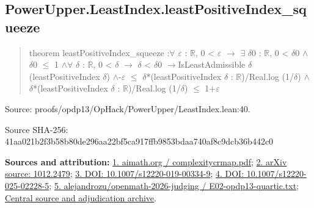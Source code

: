 \documentclass[11pt,a4paper]{article}
\begin{document}
\begin{samepage}
\subsection{PowerUpper.LeastIndex.leastPositiveIndex\_squeeze}
\begin{quote}\small\ttfamily theorem leastPositiveIndex\_squeeze :\newline     \ensuremath{\forall} \ensuremath{\varepsilon} : \ensuremath{\mathbb{R}}, 0 < \ensuremath{\varepsilon} \ensuremath{\to} \ensuremath{\exists} \ensuremath{\delta}0 : \ensuremath{\mathbb{R}}, 0 < \ensuremath{\delta}0 \ensuremath{\wedge} \ensuremath{\delta}0 \ensuremath{\leq} 1 \ensuremath{\wedge}\newline       \ensuremath{\forall} \ensuremath{\delta} : \ensuremath{\mathbb{R}}, 0 < \ensuremath{\delta} \ensuremath{\to} \ensuremath{\delta} < \ensuremath{\delta}0 \ensuremath{\to}\newline         IsLeastAdmissible \ensuremath{\delta} (leastPositiveIndex \ensuremath{\delta}) \ensuremath{\wedge}-\ensuremath{\varepsilon} \ensuremath{\leq} \ensuremath{\delta}*(leastPositiveIndex \ensuremath{\delta} : \ensuremath{\mathbb{R}})/Real.log (1/\ensuremath{\delta}) \ensuremath{\wedge}\newline         \ensuremath{\delta}*(leastPositiveIndex \ensuremath{\delta} : \ensuremath{\mathbb{R}})/Real.log (1/\ensuremath{\delta}) \ensuremath{\leq} 1+\ensuremath{\varepsilon}\end{quote}
{\small Source: proofs/opdp13/OpHack/PowerUpper/LeastIndex.lean:40.\par}

{\small Source SHA-256: 41aa021b2f3b58b80de296aa22bf5ca917ffb9853bdaa740af8c9dcb36b442c0\par}

{\small\textbf{Sources and attribution:} \href{https://aimath.org/WWN/complexitycrmap/complexitycrmap.pdf}{1. aimath.org / complexitycrmap.pdf}; \href{https://arxiv.org/abs/1012.2479}{2. arXiv source: 1012.2479}; \href{https://doi.org/10.1007/s12220-019-00334-9}{3. DOI: 10.1007/s12220-019-00334-9}; \href{https://doi.org/10.1007/s12220-025-02228-5}{4. DOI: 10.1007/s12220-025-02228-5}; \href{https://github.com/alejandrozu/openmath-2026-judging/blob/d0ed487f487fa7ec814ff705ab55249983fe8707/OpenMath-Judging/review/entries/E02-opdp13-quartic.txt}{5. alejandrozu/openmath-2026-judging / E02-opdp13-quartic.txt}; \href{https://github.com/alejandrozu/openmath-2026-judging}{Central source and adjudication archive}.\par}

\end{samepage}
\clearpage
\end{document}
